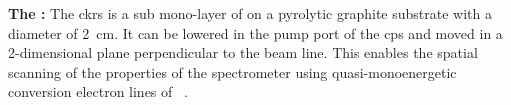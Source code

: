 {\par\textbf{The :} The \gls{ckrs} is a sub mono-layer of \kryptonEightyThree{} on a pyrolytic graphite substrate with a diameter of \SI{2}{cm}. It can be lowered in the pump port of the \gls{cps} and moved in a 2-dimensional plane perpendicular to the beam line. This enables the spatial scanning of the properties of the spectrometer using quasi-monoenergetic conversion electron lines of \kryptonEightyThree~\cite{Bauer2014, Dyba2019, Arenz2018Kr}.}
